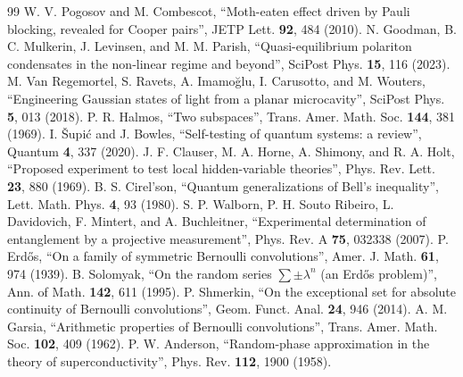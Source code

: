 \documentclass[11pt,a4paper]{article}
\begin{document}
\begin{thebibliography}{99}
 W. V. Pogosov and M. Combescot, ``Moth-eaten effect driven by Pauli blocking, revealed for Cooper pairs'', JETP Lett. \textbf{92}, 484 (2010).
 N. Goodman, B. C. Mulkerin, J. Levinsen, and M. M. Parish, ``Quasi-equilibrium polariton condensates in the non-linear regime and beyond'', SciPost Phys. \textbf{15}, 116 (2023).
 M. Van Regemortel, S. Ravets, A. Imamo\u{g}lu, I. Carusotto, and M. Wouters, ``Engineering Gaussian states of light from a planar microcavity'', SciPost Phys. \textbf{5}, 013 (2018).
 P. R. Halmos, ``Two subspaces'', Trans. Amer. Math. Soc. \textbf{144}, 381 (1969).
 I. \v{S}upi\'c and J. Bowles, ``Self-testing of quantum systems: a review'', Quantum \textbf{4}, 337 (2020).
 J. F. Clauser, M. A. Horne, A. Shimony, and R. A. Holt, ``Proposed experiment to test local hidden-variable theories'', Phys. Rev. Lett. \textbf{23}, 880 (1969).
 B. S. Cirel'son, ``Quantum generalizations of Bell's inequality'', Lett. Math. Phys. \textbf{4}, 93 (1980).
 S. P. Walborn, P. H. Souto Ribeiro, L. Davidovich, F. Mintert, and A. Buchleitner, ``Experimental determination of entanglement by a projective measurement'', Phys. Rev. A \textbf{75}, 032338 (2007).
 P. Erd\H{o}s, ``On a family of symmetric Bernoulli convolutions'', Amer. J. Math. \textbf{61}, 974 (1939).
 B. Solomyak, ``On the random series $\sum\pm\lambda^n$ (an Erd\H{o}s problem)'', Ann. of Math. \textbf{142}, 611 (1995).
 P. Shmerkin, ``On the exceptional set for absolute continuity of Bernoulli convolutions'', Geom. Funct. Anal. \textbf{24}, 946 (2014).
 A. M. Garsia, ``Arithmetic properties of Bernoulli convolutions'', Trans. Amer. Math. Soc. \textbf{102}, 409 (1962).
 P. W. Anderson, ``Random-phase approximation in the theory of superconductivity'', Phys. Rev. \textbf{112}, 1900 (1958).
\end{thebibliography}
\end{document}
